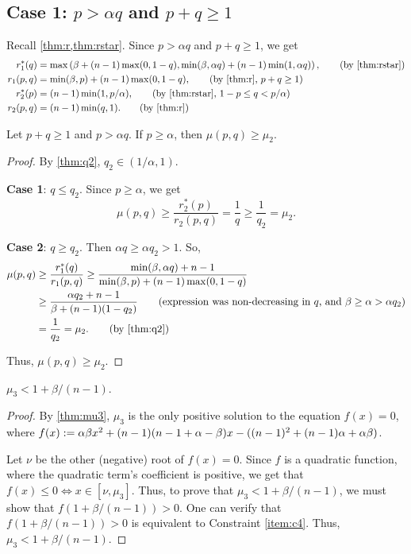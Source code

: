 \subsection{\texorpdfstring{\boldmath}{}Case 1:
    \texorpdfstring{$p > \alpha q$}{p > aq}
    and \texorpdfstring{$p + q \ge 1$}{p + q >= 1}}
\label{sec:case1}

Recall \cref{thm:r,thm:rstar}.
Since $p > \alpha q$ and $p + q \ge 1$, we get
\begin{align*}
r_1^*(q) &= \max\left(\beta + (n-1)\max(0, 1-q),
    \min(\beta, \alpha q) + (n-1)\min(1, \alpha q)\right),
    \tag{by \cref{thm:rstar}}
\\ r_1(p, q) &= \min(\beta, p) + (n-1)\max(0, 1-q),
    \tag{by \cref{thm:r}, $p + q \ge 1$}
\\ r_2^*(p) &= (n-1)\min(1, p/\alpha),
    \tag{by \cref{thm:rstar}, $1-p \le q < p/\alpha$}
\\ r_2(p, q) &= (n-1)\min(q, 1).
    \tag{by \cref{thm:r}}
\end{align*}

\begin{lemma}
\label{thm:1.1}
Let $p + q \ge 1$ and $p > \alpha q$.
If $p \ge \alpha$, then $\mu(p, q) \ge \mu_2$.
\end{lemma}
\begin{proof}
By \cref{thm:q2}, $q_2 \in (1/\alpha, 1)$.

\textbf{Case 1}: $q \le q_2$. Since $p \ge \alpha$, we get
\[ \mu(p, q) \ge \frac{r_2^*(p)}{r_2(p, q)} = \frac{1}{q} \ge \frac{1}{q_2} = \mu_2. \]

\textbf{Case 2}: $q \ge q_2$. Then $\alpha q \ge \alpha q_2 > 1$. So,
\begin{align*}
\mu(p, q) &\ge \frac{r_1^*(q)}{r_1(p, q)}
    \ge \frac{\min(\beta, \alpha q) + n-1}{\min(\beta, p) + (n-1)\max(0, 1-q)}
\\ &\ge \frac{\alpha q_2 + n-1}{\beta + (n-1)(1-q_2)}
        \tag{expression was non-decreasing in $q$, and $\beta \ge \alpha > \alpha q_2$}
\\ &= \frac{1}{q_2} = \mu_2.
        \tag{by \cref{thm:q2}}
\end{align*}

Thus, $\mu(p, q) \ge \mu_2$.
\end{proof}

\begin{lemma}
\label{thm:mu3-2}
$\mu_3 < 1 + \beta/(n-1)$.
\end{lemma}
\begin{proof}
By \cref{thm:mu3}, $\mu_3$ is the only positive solution to the equation $f(x) = 0$,
where $f(x) := \alpha\beta x^2 + (n-1)(n-1+\alpha-\beta)x - ((n-1)^2 + (n-1)\alpha + \alpha\beta)$.

Let $\nu$ be the other (negative) root of $f(x) = 0$.
Since $f$ is a quadratic function, where the quadratic term's coefficient is positive,
we get that $f(x) \le 0 \iff x \in [\nu, \mu_3]$.
Thus, to prove that $\mu_3 < 1 + \beta/(n-1)$,
we must show that $f(1 + \beta/(n-1)) > 0$.
One can verify that $f(1 + \beta/(n-1)) > 0$ is equivalent to Constraint \ref{item:c4}.
Thus, $\mu_3 < 1 + \beta/(n-1)$.
\end{proof}

